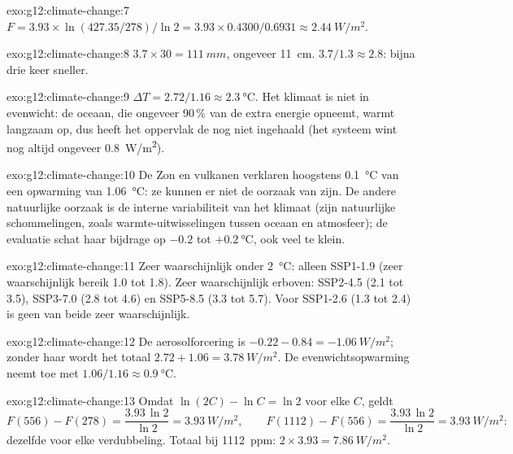 \begin{solution}{exo:g12:climate-change:7}
$F = 3.93 \times \ln(427.35/278)/\ln 2 = 3.93 \times 0.4300/0.6931 \approx
\qty{2.44}{W/m^2}$.
\end{solution}

\begin{solution}{exo:g12:climate-change:8}
$3.7 \times 30 = \qty{111}{mm}$, ongeveer \qty{11}{cm}. $3.7/1.3 \approx 2.8$:
bijna drie keer sneller.
\end{solution}

\begin{solution}{exo:g12:climate-change:9}
$\Delta T = 2.72/1.16 \approx \qty{2.3}{\degreeCelsius}$. Het klimaat is niet
in evenwicht: de oceaan, die ongeveer 90\,\% van de extra energie opneemt,
warmt langzaam op, dus heeft het oppervlak de  nog niet ingehaald (het
systeem wint nog altijd ongeveer \qty{0.8}{W/m^2}).
\end{solution}

\begin{solution}{exo:g12:climate-change:10}
De Zon en vulkanen verklaren hoogstens \qty{0.1}{\degreeCelsius} van een
opwarming van \qty{1.06}{\degreeCelsius}: ze kunnen er niet de oorzaak van zijn. De andere
natuurlijke oorzaak is de interne variabiliteit van het klimaat (zijn natuurlijke
schommelingen, zoals warmte-uitwisselingen tussen oceaan en atmosfeer); de
evaluatie schat haar bijdrage op $-0.2$ tot $+\qty{0.2}{\degreeCelsius}$,
ook veel te klein.
\end{solution}

\begin{solution}{exo:g12:climate-change:11}
Zeer waarschijnlijk onder \qty{2}{\degreeCelsius}: alleen SSP1-1.9 (zeer waarschijnlijk bereik
1.0 tot 1.8). Zeer waarschijnlijk erboven: SSP2-4.5 (2.1 tot 3.5), SSP3-7.0 (2.8 tot 4.6)
en SSP5-8.5 (3.3 tot 5.7). Voor SSP1-2.6 (1.3 tot 2.4) is geen van beide zeer waarschijnlijk.
\end{solution}

\begin{solution}{exo:g12:climate-change:12}
De aerosolforcering is $-0.22 - 0.84 = \qty{-1.06}{W/m^2}$; zonder haar wordt het
totaal $2.72 + 1.06 = \qty{3.78}{W/m^2}$. De evenwichtsopwarming
neemt toe met $1.06/1.16 \approx \qty{0.9}{\degreeCelsius}$.
\end{solution}

\begin{solution}{exo:g12:climate-change:13}
Omdat $\ln(2C) - \ln C = \ln 2$ voor elke $C$, geldt
\[
  F(556) - F(278) = \frac{3.93\,\ln 2}{\ln 2} = \qty{3.93}{W/m^2}, \qquad
  F(1112) - F(556) = \frac{3.93\,\ln 2}{\ln 2} = \qty{3.93}{W/m^2}:
\]
dezelfde  voor elke verdubbeling. Totaal bij \qty{1112}{ppm}: $2 \times 3.93 =
\qty{7.86}{W/m^2}$.
\end{solution}

